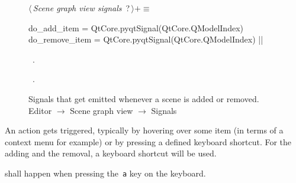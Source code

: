 \documentclass[%
    a4paper,    %
    justified,  %
    nobib,      %
    openany     %
]{tufte-book}
\makeatletter
\renewcommand{\label}[1]{\@tufte@label{##1}}%
\makeatother
\begin{document}
\begin{figure}
\begin{flushleft} \small
\begin{minipage}{\linewidth}\label{scrap46}\raggedright\small
{} $\langle\,${\itshape Scene graph view signals}\nobreak\ {\footnotesize {?}}$\,\rangle+\equiv$
\vspace{-1ex}
\begin{pythoncode}
do_add_item = QtCore.pyqtSignal(QtCore.QModelIndex)
do_remove_item = QtCore.pyqtSignal(QtCore.QModelIndex)
|\NWsep|
\end{pythoncode}
\vspace{1.5ex}
\footnotesize
\begin{list}{}{\setlength{\itemsep}{-\parsep}\setlength{\itemindent}{-\leftmargin}}
\item \NWtxtMacroDefBy\ .
\item \NWtxtMacroRefIn\ .

\item{}
\end{list}
\end{minipage}\vspace{4ex}
\end{flushleft}
\caption{Signals that get emitted whenever a scene is added or removed.
  \newline{}\newline{}Editor $\rightarrow$ Scene graph view
  $\rightarrow$ Signals}
\label{editor:lst:scene-graph-view:signals:do-add-remove-item}
\end{figure}

An action gets triggered, typically by hovering over some item (in terms of a
context menu for example) or by pressing a defined keyboard shortcut. For the
adding and the removal, a keyboard shortcut will be used.

 shall happen when pressing the~\verb=a= key
on the keyboard.
\end{document}
